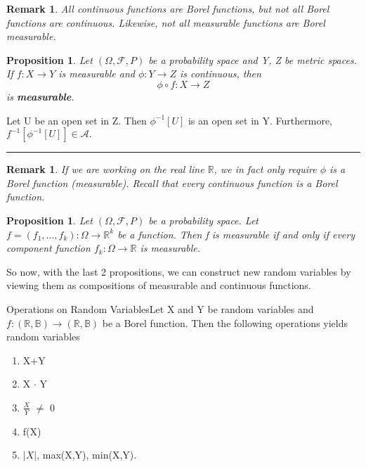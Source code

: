 \documentclass[twoside]{article}
\newtheorem{proposition}[theorem]{Proposition}
\newtheorem{remark}[theorem]{Remark}
\newenvironment{proof}{{\bf Proof:}}{\hfill\rule{2mm}{2mm}}
\begin{document}
\begin{remark}All continuous functions are Borel functions, but not all Borel functions are continuous. Likewise, not all measurable functions are Borel measurable.
\end{remark}


\begin{proposition}Let $(\Omega, \mathcal{F}, P)$ be a probability space and Y, Z be metric spaces. If $f: X \rightarrow Y$ is measurable and $\phi: Y \rightarrow Z$ is continuous, then 
$$
\phi \circ f: X \rightarrow Z
$$
is \textbf{measurable}.
\end{proposition}

\begin{proof} Let U be an open set in Z. Then $\phi^{-1}[U]$ is an open set in Y. Furthermore, $f^{-1}[\phi^{-1}[U]] \in \mathcal{A}.$ 
\end{proof}

\begin{remark}If we are working on the real line $\mathbb{R}$, we in fact only require $\phi$ is a Borel function (measurable). Recall that every continuous function is a Borel function.
\end{remark}

\begin{proposition}Let $(\Omega, \mathcal{F}, P)$ be a probability space. Let $f = (f_1,...,f_k): \Omega \rightarrow \mathbb{R}^k$ be a function. Then f is measurable if and only if every component function $f_k: \Omega \rightarrow \mathbb{R}$ is measurable.
\end{proposition}

So now, with the last 2 propositions, we can construct new random variables by viewing them as compositions of measurable and continuous functions.
\begin{theorem_exam}{Operations on Random Variables}{}Let X and Y be random variables and $f:(\mathbb{R},\mathbb{B}) \rightarrow (\mathbb{R},\mathbb{B})$ be a Borel function. Then the following operations yields random variables
\begin{enumerate}
\item X+Y
\item X $\cdot$ Y
\item $\frac{X}{Y}$  $\neq$ 0
\item f(X)
\item $|X|$, max(X,Y), min(X,Y).
\end{enumerate}
\end{theorem_exam}
\end{document}
